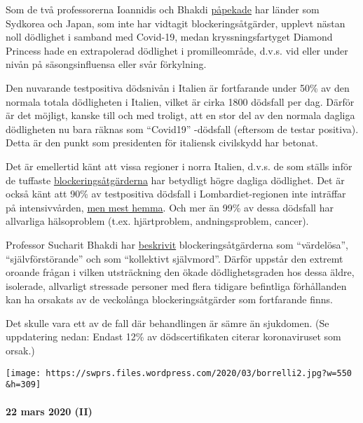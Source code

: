Som de två professorerna Ioannidis och Bhakdi
\href{https://www.statnews.com/2020/03/17/a-fiasco-in-the-making-as-the-coronavirus-pandemic-takes-hold-we-are-making-decisions-without-reliable-data/}{påpekade}
har länder som Sydkorea och Japan, som inte har vidtagit
blockeringsåtgärder, upplevt nästan noll dödlighet i samband med
Covid-19, medan kryssningsfartyget Diamond Princess hade en extrapolerad
dödlighet i promilleområde, d.v.s. vid eller under nivån på
säsongsinfluensa eller svår förkylning.

Den nuvarande testpositiva dödsnivån i Italien är fortfarande under 50\%
av den normala totala dödligheten i Italien, vilket är cirka 1800
dödsfall per dag. Därför är det möjligt, kanske till och med troligt,
att en stor del av den normala dagliga dödligheten nu bara räknas som
``Covid19'' -dödsfall (eftersom de testar positiva). Detta är den punkt
som presidenten för italiensk civilskydd har betonat.

Det är emellertid känt att vissa regioner i norra Italien, d.v.s. de som
ställs inför de tuffaste
\href{https://en.wikipedia.org/wiki/2020_Italy_coronavirus_lockdown}{blockeringsåtgärderna}
har betydligt högre dagliga dödlighet. Det är också känt att 90\% av
testpositiva dödsfall i Lombardiet-regionen inte inträffar på
intensivvården,
\href{https://www.tgcom24.mediaset.it/cronaca/coronavirus-in-lombardia-9-morti-su-10-mai-giunti-in-terapia-intensiva_16362350-202002a.shtml}{men
mest hemma}. Och mer än 99\% av dessa dödsfall har allvarliga
hälsoproblem (t.ex. hjärtproblem, andningsproblem, cancer).

Professor Sucharit Bhakdi har
\href{https://www.youtube.com/watch?v=JBB9bA-gXL4}{beskrivit}
blockeringsåtgärderna som ``värdelösa'', ``självförstörande'' och som
``kollektivt självmord''. Därför uppstår den extremt oroande frågan i
vilken utsträckning den ökade dödlighetsgraden hos dessa äldre,
isolerade, allvarligt stressade personer med flera tidigare befintliga
förhållanden kan ha orsakats av de veckolånga blockeringsåtgärder som
fortfarande finns.

Det skulle vara ett av de fall där behandlingen är sämre än sjukdomen.
(Se uppdatering nedan: Endast 12\% av dödscertifikaten citerar
koronaviruset som orsak.)

\texttt{[image: https://swprs.files.wordpress.com/2020/03/borrelli2.jpg?w=550\\\&h=309]}

\hypertarget{22-mars-2020-ii}{%
\paragraph{22 mars 2020 (II)}\label{22-mars-2020-ii}}

